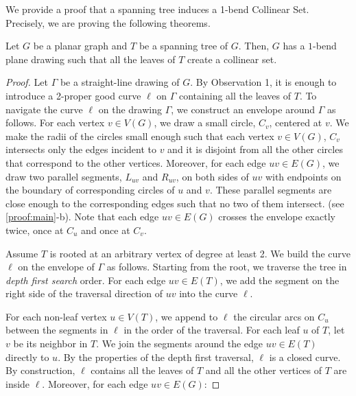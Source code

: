 

We provide a proof that a spanning tree induces a 1-bend Collinear Set. Precisely, we are proving the following theorems.

\begin{thm} \label{app-main}

Let $G$ be a planar graph and $T$ be a spanning tree of $G$. Then, $G$ has a $1$-bend plane drawing such that all the leaves of $T$ create a collinear set.

\end{thm}

\begin{proof}
    
    Let $\Gamma$ be a straight-line drawing of $G$. 
    By Observation 1, it is enough to introduce a 2-proper good curve $\ell$ on $\Gamma$ containing all the leaves of $T$. To navigate the curve $\ell$ on the drawing $\Gamma$, we construct an envelope around $\Gamma$ as follows. For each vertex $v \in V(G)$, we draw a small circle, $C_v$, centered at $v$. We make the radii of the circles small enough such that each vertex $v \in V(G)$, $C_v$ intersects only the edges incident to $v$ and it is disjoint from all the other circles that correspond to the other vertices. Moreover, for each edge $uv \in E(G)$, we draw two parallel segments, $L_{uv}$ and $R_{uv}$, on both sides of $uv$ with endpoints on the boundary of corresponding circles of $u$ and $v$. These parallel segments are close enough to the corresponding edges such that no two of them intersect. (see \cref{proof:main}-b). Note that each edge $uv \in E(G)$ crosses the envelope exactly twice, once at $C_u$ and once at $C_v$.

    Assume $T$ is rooted at an arbitrary vertex of degree at least 2. We build the curve $\ell$ on the envelope of $\Gamma$ as follows. Starting from the root, we traverse the tree in \textit{depth first search} order. For each edge $uv \in E(T)$, we add the segment on the right side of the traversal direction of $uv$ into the curve $\ell$. 
    
    For each non-leaf vertex $u \in V(T)$, we append to $\ell$ the circular arcs on $C_u$ between the segments in $\ell$ in the order of the traversal. For each leaf $u$ of $T$, let $v$ be its neighbor in $T$. We join the segments around the edge $uv \in E(T)$ directly to $u$. By the properties of the depth first traversal, $\ell$ is a closed curve. By construction, $\ell$ contains all the leaves of $T$ and all the other vertices of $T$ are inside $\ell$. Moreover, for each edge $uv \in E(G)$:


\end{proof}

